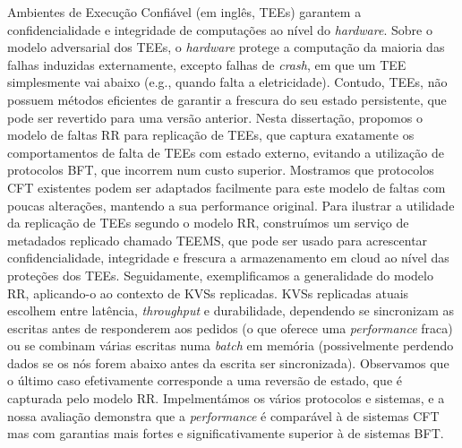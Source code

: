 \acresetall
\noindent Ambientes de Execução Confiável (em inglês, TEEs)
garantem a confidencialidade e integridade de computações ao
nível do \textit{hardware}. Sobre o modelo adversarial dos TEEs, o
\textit{hardware} protege a computação da maioria das falhas
induzidas externamente, excepto falhas de \textit{crash}, em que
um TEE simplesmente vai abaixo (e.g., quando falta a
eletricidade). Contudo, TEEs, não possuem métodos eficientes de
garantir a frescura do seu estado persistente, que pode ser
revertido para uma versão anterior. Nesta dissertação, propomos o
modelo de faltas \ac{RR} para replicação de TEEs, que captura
exatamente os comportamentos de falta de TEEs com estado externo,
evitando a utilização de protocolos BFT, que incorrem num custo
superior. Mostramos que protocolos CFT existentes podem ser
adaptados facilmente para este modelo de faltas com poucas
alterações, mantendo a sua performance original.
\vskip -0cm
Para ilustrar a utilidade da replicação de TEEs segundo o
modelo RR, construímos um serviço de metadados replicado chamado
TEEMS, que pode ser usado para acrescentar confidencialidade,
integridade e frescura a armazenamento em cloud ao nível das
proteções dos TEEs. Seguidamente, exemplificamos a generalidade
do modelo RR, aplicando-o ao contexto de KVSs replicadas. KVSs
replicadas atuais escolhem entre latência, \textit{throughput} e
durabilidade, dependendo se sincronizam as escritas antes de
responderem aos pedidos (o que oferece uma \textit{performance}
fraca) ou se combinam várias escritas numa \textit{batch} em
memória (possivelmente perdendo dados se os nós forem abaixo
antes da escrita ser sincronizada). Observamos que o último
caso efetivamente corresponde a uma reversão de estado, que é
capturada pelo modelo RR.
\vskip 0cm
Impelmentámos os vários protocolos e sistemas, e a nossa
avaliação demonstra que a \textit{performance} é comparável à de
sistemas CFT mas com garantias mais fortes e significativamente
superior à de sistemas BFT.
